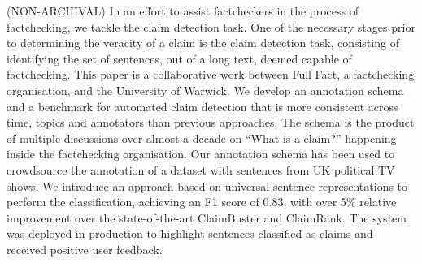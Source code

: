 (NON-ARCHIVAL) In an effort to assist factcheckers in the process of factchecking, we tackle the claim detection task. One of the necessary stages prior to determining the veracity of a claim is the claim detection task, consisting of identifying the set of sentences, out of a long text, deemed capable of factchecking. This paper is a collaborative work between Full Fact, a factchecking organisation, and the University of Warwick. We develop an annotation schema and a benchmark for automated claim detection that is more consistent across time, topics and annotators than previous approaches. The schema is the product of multiple discussions over almost a decade on ``What is a claim?'' happening inside the factchecking organisation. Our annotation schema has been used to crowdsource the annotation of a dataset with sentences from UK political TV shows.  We introduce an approach based on universal sentence representations to perform the classification, achieving an F1 score of 0.83, with over 5\% relative improvement over the state-of-the-art ClaimBuster and ClaimRank. The system was deployed in production to highlight sentences classified as claims and received positive user feedback.
